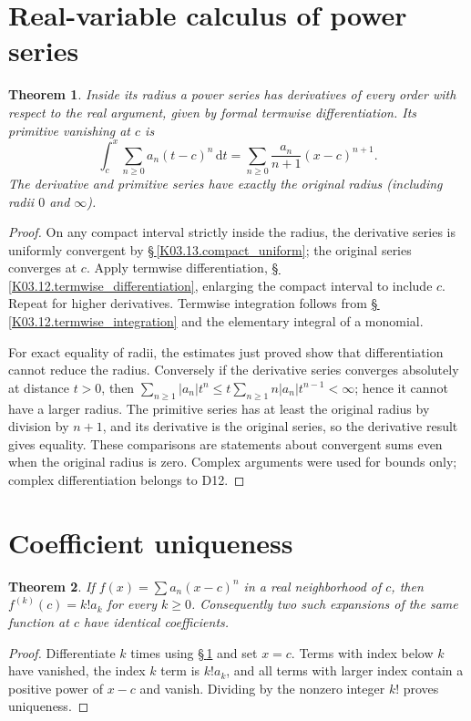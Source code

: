\documentclass[11pt,oneside,a4paper]{book}
\newtheorem{theorem}{Theorem}[chapter]
\theoremstyle{definition}
\theoremstyle{remark}
\newcommand{\abs}[1]{\lvert#1\rvert}
\newcommand{\dd}{\,\mathrm d}
\newcommand{\KEntry}[2]{\Needspace{7\baselineskip}\section{#2}\label{#1}{\small\sffamily\color{black!60}\detokenize{#1}}\par}
\newcommand{\KRef}[1]{\hyperref[#1]{\S\,\ref*{#1}}}
\begin{document}
\KEntry{K03.13.termwise}{Real-variable calculus of power series}
\begin{theorem}
Inside its radius a power series has derivatives of every order with respect to the real argument, given by formal termwise differentiation. Its primitive vanishing at $c$ is
\[\int_c^x\sum_{n\geq0}a_n(t-c)^n\dd t=\sum_{n\geq0}\frac{a_n}{n+1}(x-c)^{n+1}.\]
The derivative and primitive series have exactly the original radius (including radii $0$ and $\infty$).
\end{theorem}
\begin{proof}
On any compact interval strictly inside the radius, the derivative series is uniformly convergent by \KRef{K03.13.compact_uniform}; the original series converges at $c$. Apply termwise differentiation, \KRef{K03.12.termwise_differentiation}, enlarging the compact interval to include $c$. Repeat for higher derivatives. Termwise integration follows from \KRef{K03.12.termwise_integration} and the elementary integral of a monomial.

For exact equality of radii, the estimates just proved show that differentiation cannot reduce the radius. Conversely if the derivative series converges absolutely at distance $t>0$, then $\sum_{n\geq1}\abs{a_n}t^n\leq t\sum_{n\geq1}n\abs{a_n}t^{n-1}<\infty$; hence it cannot have a larger radius. The primitive series has at least the original radius by division by $n+1$, and its derivative is the original series, so the derivative result gives equality. These comparisons are statements about convergent sums even when the original radius is zero. Complex arguments were used for bounds only; complex differentiation belongs to D12.
\end{proof}

\KEntry{K03.13.uniqueness}{Coefficient uniqueness}
\begin{theorem}
If $f(x)=\sum a_n(x-c)^n$ in a real neighborhood of $c$, then $f^{(k)}(c)=k!a_k$ for every $k\geq0$. Consequently two such expansions of the same function at $c$ have identical coefficients.
\end{theorem}
\begin{proof}
Differentiate $k$ times using \KRef{K03.13.termwise} and set $x=c$. Terms with index below $k$ have vanished, the index $k$ term is $k!a_k$, and all terms with larger index contain a positive power of $x-c$ and vanish. Dividing by the nonzero integer $k!$ proves uniqueness.
\end{proof}
\end{document}
